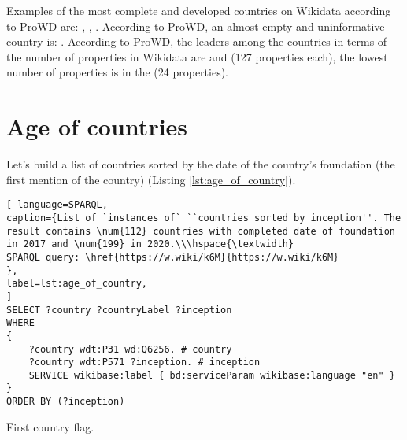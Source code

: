 Examples of the most complete and developed countries on Wikidata according to ProWD are: , , . According to ProWD, an almost empty and uninformative country is: . According to ProWD, the leaders among the countries in terms of the number of properties in Wikidata are  and  (127 properties each), the lowest number of properties is in the   (24 properties).


\section{Age of countries}

Let's build a list of countries sorted by the date of the country's foundation (the first mention of the country) (Listing \ref{lst:age_of_country}).

\begin{lstlisting}[ language=SPARQL, 
caption={List of `instances of` ``countries sorted by inception''. The result contains \num{112} countries with completed date of foundation in 2017 and \num{199} in 2020.\\\hspace{\textwidth}
SPARQL query: \href{https://w.wiki/k6M}{https://w.wiki/k6M}
},
label=lst:age_of_country, 					
]
SELECT ?country ?countryLabel ?inception
WHERE
{
	?country wdt:P31 wd:Q6256. # country
	?country wdt:P571 ?inception. # inception
	SERVICE wikibase:label { bd:serviceParam wikibase:language "en" }
}
ORDER BY (?inception)
\end{lstlisting}


\begin{marginfigure}[-0.8cm]
	{
		\setlength{\fboxsep}{0pt}%
		\setlength{\fboxrule}{1pt}%
	}
	\caption{First country flag.}%
	\label{fig:flag_kor}%
\end{marginfigure}

